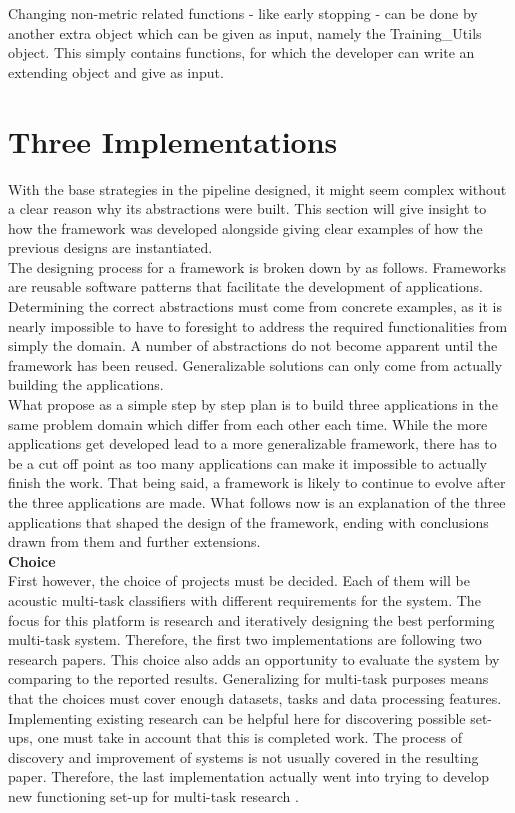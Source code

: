 Changing non-metric related functions - like early stopping - can be done by another extra object which can be given as input, namely the Training\_Utils object. This simply contains functions, for which the developer can write an extending object and give as input. \\ 

\section{Three Implementations}

With the base strategies in the pipeline designed, it might seem complex without a clear reason why its abstractions were built. This section will give insight to how the framework was developed alongside giving clear examples of how the previous designs are instantiated. \\

The designing process for a framework is broken down by \cite{roberts1996evolving} as follows. Frameworks are reusable software patterns that facilitate the development of applications. Determining the correct abstractions must come from concrete examples, as it is nearly impossible to have to foresight to address the required functionalities from simply the domain. A number of abstractions do not become apparent until the framework has been reused. Generalizable solutions can only come from actually building the applications. \\

What \citep{roberts1996evolving} propose as a simple step by step plan is to build three applications in the same problem domain which differ from each other each time. While the more applications get developed lead to a more generalizable framework, there has to be a cut off point as too many applications can make it impossible to actually finish the work. That being said, a framework is likely to continue to evolve after the three applications are made. What follows now is an explanation of the three applications that shaped the design of the framework, ending with conclusions drawn from them and further extensions. \\

{\large \textbf{Choice}} \\

First however, the choice of projects must be decided. Each of them will be acoustic multi-task classifiers with different requirements for the system. The focus for this platform is research and iteratively designing the best performing multi-task system. Therefore, the first two implementations are following two research papers. This choice also adds an opportunity to evaluate the system by comparing to the reported results. Generalizing for multi-task purposes means that the choices must cover enough datasets, tasks and data processing features. Implementing existing research can be helpful here for discovering possible set-ups, one must take in account that this is completed work. The process of discovery and improvement of systems is not usually covered in the resulting paper. Therefore, the last implementation actually went into trying to develop new functioning set-up for multi-task research . \\


